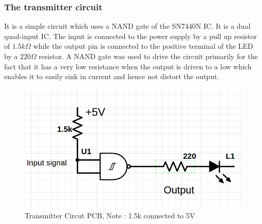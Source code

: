 \documentclass{article}
\begin{document}
\subsubsection{The transmitter circuit}
It is a simple circuit which uses a NAND gate of the SN7440N IC. It is a dual quad-input IC. The input is connected to the power supply by a pull up resistor of $1.5k \Omega$ while the output pin is connected to the positive terminal of the LED by a $220 \Omega $ resistor. A NAND gate was used to drive the circuit primarily for the fact that it has a very low resistance when the output is driven to a low which enables it to easily sink in current and hence not distort the output.
\begin{figure}[h]
  \centering
  \includegraphics[scale=0.5]{images/transmitter_ckt_diag}
  \caption{Transmitter Circut PCB, Note : 1.5k connected to 5V}
  \label{fig:tx_circuit}
\end{figure}
\end{document}
